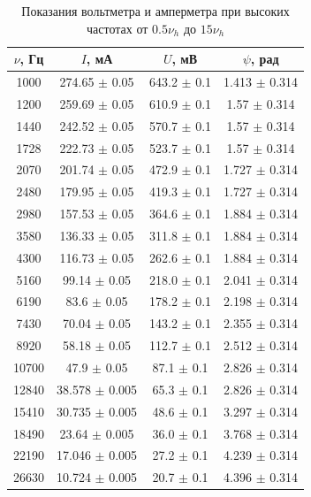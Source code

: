 \newpage
\begin{table}[h!]
    \centering
    \begin{tabular}{|c|c|c|c|}
        \hline
        $\nu$, Гц & $I$, мА & $U$, мВ & $\psi$, рад\\\hline
        1000  & 274.65 $\pm$ 0.05  & 643.2 $\pm$ 0.1 & 1.413 $\pm$ 0.314\\\hline
        1200  & 259.69 $\pm$ 0.05  & 610.9 $\pm$ 0.1 & 1.57  $\pm$ 0.314\\\hline
        1440  & 242.52 $\pm$ 0.05  & 570.7 $\pm$ 0.1 & 1.57  $\pm$ 0.314\\\hline
        1728  & 222.73 $\pm$ 0.05  & 523.7 $\pm$ 0.1 & 1.57  $\pm$ 0.314\\\hline
        2070  & 201.74 $\pm$ 0.05  & 472.9 $\pm$ 0.1 & 1.727 $\pm$ 0.314\\\hline
        2480  & 179.95 $\pm$ 0.05  & 419.3 $\pm$ 0.1 & 1.727 $\pm$ 0.314\\\hline
        2980  & 157.53 $\pm$ 0.05  & 364.6 $\pm$ 0.1 & 1.884 $\pm$ 0.314\\\hline
        3580  & 136.33 $\pm$ 0.05  & 311.8 $\pm$ 0.1 & 1.884 $\pm$ 0.314\\\hline
        4300  & 116.73 $\pm$ 0.05  & 262.6 $\pm$ 0.1 & 1.884 $\pm$ 0.314\\\hline
        5160  & 99.14  $\pm$ 0.05  & 218.0 $\pm$ 0.1 & 2.041 $\pm$ 0.314\\\hline
        6190  & 83.6   $\pm$ 0.05  & 178.2 $\pm$ 0.1 & 2.198 $\pm$ 0.314\\\hline
        7430  & 70.04  $\pm$ 0.05  & 143.2 $\pm$ 0.1 & 2.355 $\pm$ 0.314\\\hline
        8920  & 58.18  $\pm$ 0.05  & 112.7 $\pm$ 0.1 & 2.512 $\pm$ 0.314\\\hline
        10700 & 47.9   $\pm$ 0.05  & 87.1  $\pm$ 0.1 & 2.826 $\pm$ 0.314\\\hline
        12840 & 38.578 $\pm$ 0.005 & 65.3  $\pm$ 0.1 & 2.826 $\pm$ 0.314\\\hline
        15410 & 30.735 $\pm$ 0.005 & 48.6  $\pm$ 0.1 & 3.297 $\pm$ 0.314\\\hline
        18490 & 23.64  $\pm$ 0.005 & 36.0  $\pm$ 0.1 & 3.768 $\pm$ 0.314\\\hline
        22190 & 17.046 $\pm$ 0.005 & 27.2  $\pm$ 0.1 & 4.239 $\pm$ 0.314\\\hline
        26630 & 10.724 $\pm$ 0.005 & 20.7  $\pm$ 0.1 & 4.396 $\pm$ 0.314\\\hline
    \end{tabular}
    \caption{Показания вольтметра и амперметра при высоких частотах от $0.5\nu_h$ до $15\nu_h$}
\end{table}

